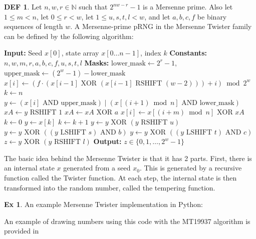 \documentclass{article}
\theoremstyle{definition}\newtheorem{definition}{DEF}
\theoremstyle{definition}\newtheorem{example}{Ex}
\theoremstyle{lemma}\newtheorem{lemma}{Lemma}
\theoremstyle{corrolary}\newtheorem{corrolary}{Cor}
\begin{document}
\begin{definition}
Let $n, w, r\in \mathbb{N}$ such that $2^{nw-r}-1$ is a Mersenne prime.
Also let $1 \leq m < n$, let $0 \leq r < w$, let $1\leq u, s, t, l <w$, and let $a, b, c, f$ be binary sequences of length $w$.
A Mersenne-prime pRNG in the Mersenne Twister family can be defined by the following algorithm:
\begin{algorithm}[H]
\caption{Generic Mersenne-Prime Generation Step}
\begin{algorithmic}[1]
\State \textbf{Input:} Seed $x[0]$, state array $x[0 \dots n-1]$, index $k$
\State \textbf{Constants:} $n, w, m, r, a, b, c, f, u, s, t, l$
\State \textbf{Masks:} $\text{lower\_mask} \leftarrow 2^r - 1$, $\text{upper\_mask} \leftarrow (2^w - 1) - \text{lower\_mask}$
        \State $x[i] \leftarrow \left(f \cdot \left(x[i-1] \text{ XOR } (x[i-1] \text{ RSHIFT } (w-2))\right) + i\right) \bmod 2^w$
    \EndFor
    \State $k \leftarrow n$
\EndIf
{}
        \State $y \leftarrow (x[i] \text{ AND } \text{upper\_mask}) \mid (x[(i+1) \bmod n] \text{ AND } \text{lower\_mask})$
        \State $xA \leftarrow y \text{ RSHIFT } 1$
            \State $xA \leftarrow xA \text{ XOR } a$
        \EndIf
        \State $x[i] \leftarrow x[(i + m) \bmod n] \text{ XOR } xA$
    \EndFor
    \State $k \leftarrow 0$
\EndIf
\State $y \leftarrow x[k]$
\State $k \leftarrow k + 1$
\State {}
\State $y \leftarrow y \text{ XOR } (y \text{ RSHIFT } u)$
\State $y \leftarrow y \text{ XOR } ((y \text{ LSHIFT } s) \text{ AND } b)$
\State $y \leftarrow y \text{ XOR } ((y \text{ LSHIFT } t) \text{ AND } c)$
\State $z \leftarrow y \text{ XOR } (y \text{ RSHIFT } l)$
\State \textbf{Output:} $z \in \{0, 1, \dots, 2^w-1\}$
\end{algorithmic}
\end{algorithm}
\end{definition}

The basic idea behind the Mersenne Twister is that it has 2 parts.
First, there is an internal state $x$ generated from a seed $x_0$.
This is generated by a recursive function called the Twister function.
At each step, the internal state is then transformed into the random number, called the tempering function.\\

\begin{example}\label{MT19937}
An example Mersenne Twister implementation in Python:

An example of drawing numbers using this code with the MT19937 algorithm is provided in 
\end{example}
\end{document}
